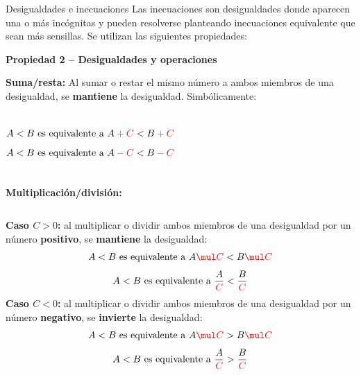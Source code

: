 \documentclass[9pt, aspectratio=169]{beamer}
\begin{document}
\begin{frame}{Desigualdades e inecuaciones}
Las inecuaciones son desigualdades donde aparecen una o más incógnitas y pueden resolverse planteando inecuaciones equivalente que sean más sensillas. Se utilizan las siguientes propiedades:

\textbf{Propiedad 2 -- Desigualdades y operaciones}

\textbf{Suma/resta:} Al sumar o restar el mismo número a ambos miembros de una desigualdad, se \textbf{mantiene} la desigualdad. Simbólicamente:
\begin{columns}
    \cx
    \[ A < B \text{ es equivalente a } A \mathcolor{red}{+C} < B  \mathcolor{red}{+C} \]
    \cx
    \[ A< B \text{ es equivalente a } A \mathcolor{red}{-C} < B  \mathcolor{red}{-C} \]
\end{columns} \medskip

\textbf{Multiplicación/división:} \medskip

\begin{columns}
\textbf{Caso $C>0$:} al multiplicar o dividir ambos miembros de una desigualdad por un número \textbf{positivo}, se \textbf{mantiene} la desigualdad:
\[ A < B \text{ es equivalente a } A \mathcolor{red}{\mul C} < B \mathcolor{red}{\mul C} \] 
\[ A < B \text{ es equivalente a } \frac{A} {\mathcolor{red}{C}} < \frac{B}{\mathcolor{red}{C}} \] 
\textbf{Caso $C<0$:} al multiplicar o dividir ambos miembros de una desigualdad por un número \textbf{negativo}, se \textbf{invierte} la desigualdad:
\[ A < B \text{ es equivalente a } A \mathcolor{red}{\mul C} > B \mathcolor{red}{\mul C} \] 
\[ A < B \text{ es equivalente a } \frac{A}{\mathcolor{red}{C}} > \frac{B}{\mathcolor{red}{C}} \] 
\end{columns}
\end{frame}
\end{document}
